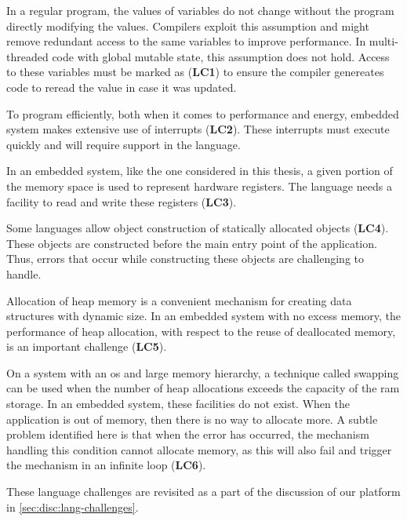 In a regular program, the values of variables do not change without the program directly modifying the values.
Compilers exploit this assumption and might remove redundant access to the same variables to improve performance.
In multi-threaded code with global mutable state, this assumption does not hold.
Access to these variables must be marked as  (\textbf{LC1}) to ensure the compiler genereates code to reread the value in case it was updated.


To program efficiently, both when it comes to performance and energy, embedded system makes extensive use of interrupts (\textbf{LC2}).
These interrupts must execute quickly and will require support in the language.

In an embedded system, like the one considered in this thesis, a given portion of the memory space is used to represent hardware registers.
The language needs a facility to read and write these registers (\textbf{LC3}).

Some languages allow object construction of statically allocated objects (\textbf{LC4}).
These objects are constructed before the main entry point of the application.
Thus, errors that occur while constructing these objects are challenging to handle.

Allocation of heap memory is a convenient mechanism for creating data structures with dynamic size.
In an embedded system with no excess memory, the performance of heap allocation, with respect to the reuse of deallocated memory, is an important challenge (\textbf{LC5}).

On a system with an \gls{os} and large memory hierarchy, a technique called swapping can be used when the number of heap allocations exceeds the capacity of the \gls{ram} storage.
In an embedded system, these facilities do not exist.
When the application is out of memory, then there is no way to allocate more.
A subtle problem identified here is that when the error has occurred, the mechanism handling this condition cannot allocate memory, as this will also fail and trigger the mechanism in an infinite loop (\textbf{LC6}).

These language challenges are revisited as a part of the discussion of our platform in \autoref{sec:disc:lang-challenges}.

